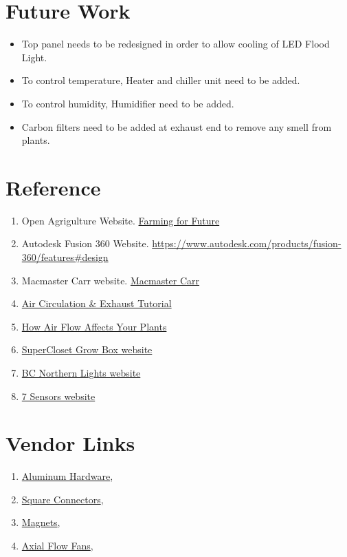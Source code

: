 \documentclass[a4paper,12pt,oneside]{book}
\begin{document}
\section{Future Work}
\begin{itemize}
\item Top panel needs to be redesigned in order to allow cooling of LED Flood Light.
\item To control temperature, Heater and chiller unit need to be added.
\item To control humidity, Humidifier need to be added.
\item Carbon filters need to be added at exhaust end to remove any smell from plants.
\end{itemize}



\section{Reference}
\begin{enumerate}
    
\item Open Agrigulture Website. \href{https://wiki.openag.media.mit.edu/}{Farming for Future}
 \item Autodesk Fusion 360 Website. \href{https://www.autodesk.com/products/fusion-360/features#design}{https://www.autodesk.com/products/fusion-360/features#design}
  \item Macmaster Carr website. \href{https://www.mcmaster.com/#aluminum-square-structural-framing-tubing/=18dj96f}{Macmaster Carr}
  \item \href{http://www.growweedeasy.com/exhaust}{Air Circulation & Exhaust Tutorial}
  \item\href{http://www.growell.co.uk/blog/2011/04/grow-room-ventilation}{How Air Flow Affects Your Plants}
  \item \href{https://supercloset.com/}{SuperCloset Grow Box website}
  \item \href{http://www.bcnorthernlights.com/learn-to-grow-your-own/what-is-a-grow-box}{BC Northern Lights website}
  \item \href{http://www.7sensors.com/}{7 Sensors website}
\end{enumerate}

\section{Vendor Links}
\begin{enumerate}
    \item \href{https://www.justdial.com/Mumbai/Variety-Aluminium-Ghatkopar-West/022P1932129_BZDET}{Aluminum Hardware},
    \item \href{https://www.indiamart.com/digitalmetrology/tube-connector.html}{Square Connectors},
    \item \href{http://www.amazon.in/Perfect-Magnets-Nickel-Coated-Pieces/dp/B01LY18VN3/ref=sr_1_7?ie=UTF8&qid=1499193943&sr=8-7&keywords=magnets}{Magnets},
    \item \href{http://www.amazon.in/60x60x25mm-Brushless-12V-Cooling-Fan/dp/B01MS9AHPC/ref=sr_1_99?ie=UTF8&qid=1499194646&sr=8-99&keywords=dc+fans+12v}{Axial Flow Fans},
\end{enumerate}
\end{document}
